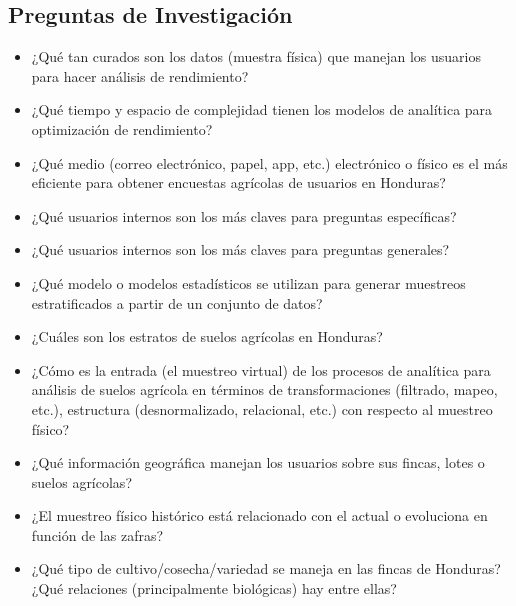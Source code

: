 %
%

\subsection{Preguntas de Investigación}

\begin{itemize}
    \item ¿Qué tan curados son los datos (muestra física) que manejan los usuarios para hacer análisis de rendimiento?

    \item ¿Qué tiempo y espacio de complejidad tienen los modelos de analítica para optimización de rendimiento?

    \item ¿Qué medio (correo electrónico, papel, app, etc.) electrónico o físico es el más eficiente para obtener encuestas agrícolas de usuarios en Honduras?

    \item ¿Qué usuarios internos son los más claves para preguntas específicas?

    \item ¿Qué usuarios internos son los más claves para preguntas generales?

    \item ¿Qué modelo o modelos estadísticos se utilizan para generar muestreos estratificados a partir de un conjunto de datos?

    \item ¿Cuáles son los estratos de suelos agrícolas en Honduras?

    \item ¿Cómo es la entrada (el muestreo virtual) de los procesos de analítica para análisis de suelos agrícola en términos de transformaciones (filtrado, mapeo, etc.), estructura (desnormalizado, relacional, etc.) con respecto al muestreo físico?

    \item ¿Qué información geográfica manejan los usuarios sobre sus fincas, lotes o suelos agrícolas?

    \item ¿El muestreo físico histórico está relacionado con el actual o evoluciona en función de las zafras?

    \item ¿Qué tipo de cultivo/cosecha/variedad se maneja en las fincas de Honduras? ¿Qué relaciones (principalmente biológicas) hay entre ellas?
\end{itemize}
